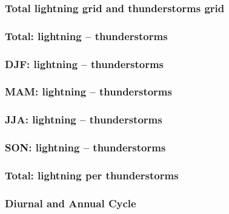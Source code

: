 \documentclass[smaller]{beamer}
\begin{document}
\begin{frame}
\frametitle{Total lightning grid and thunderstorms grid}

\end{frame}




\begin{frame}
\frametitle{Total: lightning -- thunderstorms}

\end{frame}


\begin{frame}
\frametitle{DJF: lightning -- thunderstorms}

\end{frame}

\begin{frame}
\frametitle{MAM: lightning -- thunderstorms}

\end{frame}

\begin{frame}
\frametitle{JJA: lightning -- thunderstorms}

\end{frame}

\begin{frame}
\frametitle{SON: lightning -- thunderstorms}

\end{frame}


\begin{frame}
\frametitle{Total: lightning per thunderstorms}

\end{frame}


\begin{frame}
\frametitle{Diurnal and Annual Cycle}

\end{frame} 


\begin{frame}
\frametitle{}

\end{frame}
\end{document}
